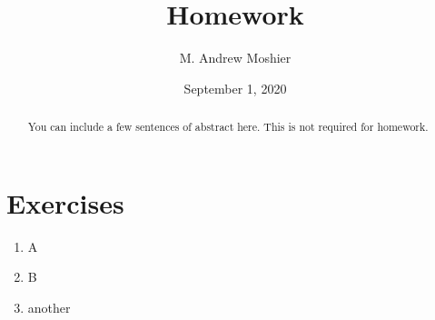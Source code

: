 \documentclass{tufte-handout}
\title{Homework}
\author[Moshier]{M. Andrew Moshier}
\date{September 1, 2020}  %
\begin{document}
\maketitle%

\begin{abstract}
\noindent You can include a few sentences of abstract here. This is not required for homework.
\end{abstract}

\section{Exercises}\label{sec:page-layout}

\begin{enumerate}[start=1] %
\item A
\item B
\item another
\end{enumerate} 


\nobibliography*

%
\end{document}
